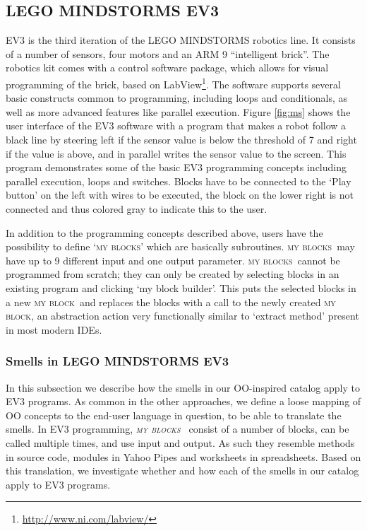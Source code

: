 \documentclass{sig-alternate}
\newcommand{\ms}{LEGO MINDSTORMS EV3}
\newcommand{\mbs}{\textsc{my blocks}}
\newcommand{\mb}{\textsc{my block}}
\begin{document}
\subsection{\ms}
\label{sec:lego}
EV3 is the third iteration of the LEGO MINDSTORMS robotics line. It consists of a number of sensors, four motors and an ARM 9 ``intelligent brick''. The robotics kit comes with a control software package, which allows for visual programming of the brick, based on LabView\footnote{\url{http://www.ni.com/labview/}}. The software supports several basic constructs common to programming, including loops and conditionals, as well as more advanced features like parallel execution. Figure \ref{fig:ms} shows the user interface of the EV3 software with a program that makes a robot follow a black line by steering left if the sensor value is below the threshold of 7 and right if the value is above, and in parallel writes the sensor value to the screen. This program demonstrates some of the basic EV3 programming concepts including parallel execution, loops and switches. Blocks have to be connected to the `Play button' on the left with wires to be executed, the block on the lower right is not connected and thus colored gray to indicate this to the user.

In addition to the programming concepts described above, users have the possibility to define `\mbs' which are basically  subroutines. \mbs~may have up to 9 different input and one output parameter. \mbs~cannot be programmed from scratch; they can only be created by selecting blocks in an existing program and clicking `my block builder'. This puts the selected blocks in a new \mb~and replaces the blocks with a call to the newly created \mb, an abstraction action very functionally similar to `extract method' present in most modern IDEs. 

\subsubsection{Smells in \ms}
In this subsection we describe how the smells in our OO-inspired catalog apply to EV3 programs. As common in the other approaches, we define a loose mapping of OO concepts to the end-user language in question, to be able to translate the smells. In EV3 programming, \emph{\mbs~} consist of a number of blocks, can be called multiple times, and use input and output. As such they resemble methods in source code, modules in Yahoo Pipes and worksheets in spreadsheets. Based on this translation, we investigate whether and how each of the smells in our catalog  apply to EV3 programs.  
\end{document}
